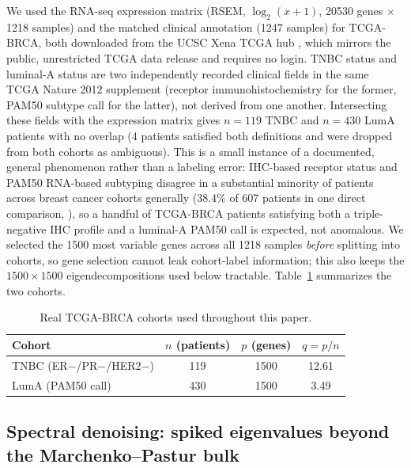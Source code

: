 \documentclass[11pt]{article}
\begin{document}
We used the RNA-seq expression matrix (RSEM, $\log_2(x+1)$, 20530
genes $\times$ 1218 samples) and the matched clinical annotation (1247
samples) for TCGA-BRCA, both downloaded from the UCSC Xena TCGA hub
\citep{xena2020,tcga2012}, which mirrors the public, unrestricted TCGA
data release and requires no login. TNBC status and luminal-A status
are two independently recorded clinical fields in the same TCGA Nature
2012 supplement (receptor immunohistochemistry for the former, PAM50
subtype call \citep{pam502009} for the latter), not derived from one
another. Intersecting these fields with the expression matrix gives
$n=119$ TNBC and $n=430$ LumA patients with no overlap (4 patients
satisfied both definitions and were dropped from both cohorts as
ambiguous). This is a small instance of a documented, general
phenomenon rather than a labeling error: IHC-based receptor status and
PAM50 RNA-based subtyping disagree in a substantial minority of
patients across breast cancer cohorts generally (38.4\% of 607 patients
in one direct comparison, \citealp{kim2019discordance}), so a handful
of TCGA-BRCA patients satisfying both a triple-negative IHC profile and
a luminal-A PAM50 call is expected, not anomalous.
We selected the 1500 most variable genes across all 1218 samples
\emph{before} splitting into cohorts, so gene selection cannot leak
cohort-label information; this also keeps the $1500\times1500$
eigendecompositions used below tractable. Table~\ref{tab:cohorts}
summarizes the two cohorts.

\begin{table}[h]
\centering
\caption{Real TCGA-BRCA cohorts used throughout this paper.}
\label{tab:cohorts}
\begin{tabular}{lccc}
\toprule
Cohort & $n$ (patients) & $p$ (genes) & $q=p/n$ \\
\midrule
TNBC (ER$-$/PR$-$/HER2$-$) & 119 & 1500 & 12.61 \\
LumA (PAM50 call) & 430 & 1500 & 3.49 \\
\bottomrule
\end{tabular}
\end{table}

\subsection{Spectral denoising: spiked eigenvalues beyond the Marchenko--Pastur bulk}
\label{sec:spiked}
\end{document}
